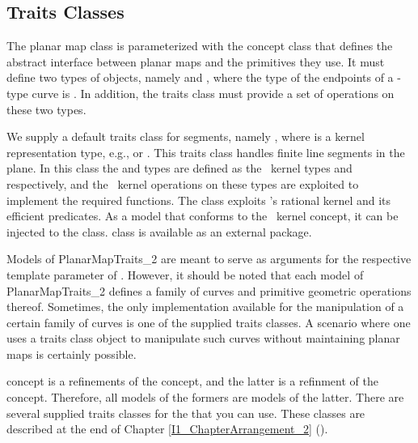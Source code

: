 \subsection{Traits Classes}
The planar map class is parameterized with the concept class
 that defines the abstract interface
between planar maps and the primitives they use. It must define two
types of objects, namely  and
, where the type of the endpoints of a
-type curve is . In
addition, the traits class must provide a set of operations on these
two types.
					  
We supply a default traits class for segments, namely
, where  is a
kernel representation type, e.g.,  or
. This traits class handles finite line segments in
the plane. In this class the
 and  types are
defined as the \cgal\ kernel types
 and 
respectively, and the \cgal\ kernel operations on these types are
exploited to implement the required functions.
The  class exploits \leda 's rational
kernel and its efficient predicates. As a model that conforms to the
\cgal\ kernel concept, it can be injected to the
 class.
 class is available as an external
package.

Models of PlanarMapTraits\_2 are meant to serve as arguments for the
respective template parameter of
. However, it should be noted
that each model of PlanarMapTraits\_2 defines a family of curves and
primitive geometric operations thereof. Sometimes, the only
implementation available for the manipulation of a certain family of
curves is one of the supplied traits classes. A scenario where one
uses a traits class object to manipulate such curves without
maintaining planar maps is certainly possible.

 concept is a refinements of the
 concept, and the latter is a
refinment of the  concept.
Therefore, all models of the formers are models of the latter. 
There are several supplied traits classes for the 
that you can use. These classes are described at the end of Chapter
\ref{I1_ChapterArrangement_2} ().

